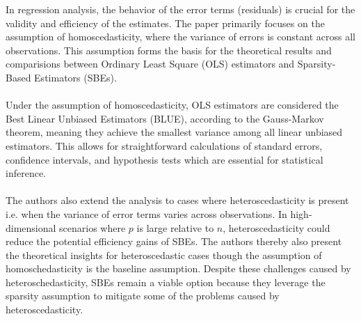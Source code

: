 In regression analysis, the behavior of the error terms (residuals) is crucial for the validity and efficiency of the estimates. The paper primarily focuses on the assumption of homoscedasticity, where the variance of errors is constant across all observations. This assumption forms the basis for the theoretical results and comparisions between Ordinary Least Square (OLS) estimators and Sparsity-Based Estimators (SBEs).\\
\\
Under the assumption of homoscedasticity, OLS estimators are considered the Best Linear Unbiased Estimators (BLUE), according to the Gauss-Markov theorem, meaning they achieve the smallest variance among all linear unbiased estimators. This allows for straightforward calculations of standard errors, confidence intervals, and hypothesis tests which are essential for statistical inference. \\
\\
The authors also extend the analysis to cases where heteroscedasticity is present i.e. when the variance of error terms varies across observations. In high-dimensional scenarios where $p$ is large relative to $n$, heteroscedasticity could reduce the potential efficiency gains of SBEs. The authors thereby also present the theoretical insights for heteroscedastic cases though the assumption of homoschedasticity is the baseline assumption. Despite these challenges caused by heteroschedasticity, SBEs remain a viable option because they leverage the sparsity assumption to mitigate some of the problems caused by heteroscedasticity. 


